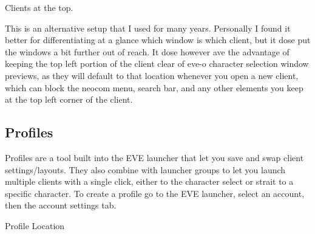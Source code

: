 \documentclass{article}
\begin{document}
\begin{center}
  Clients at the top.
\end{center}
This is an alternative setup that I used for many years. Personally I found it better for differentiating at a glance which window is 
which client, but it dose put the windows a bit further out of reach. It dose however ave the advantage of keeping the top left portion 
of the client clear of eve-o character selection window previews, as they will default to that location whenever you open a new client, 
which can block the neocom menu, search bar, and any other elements you keep at the top left corner of the client.
\clearpage
\subsection{Profiles}
Profiles are a tool built into the EVE launcher that let you save and swap client settings/layouts. They also combine with launcher groups
to let you launch multiple clients with a single click, either to the character select or strait to a specific character. To create a profile
go to the EVE launcher, select an account, then the account settings tab.
\\
\begin{center}
  Profile Location
\end{center}
\end{document}
